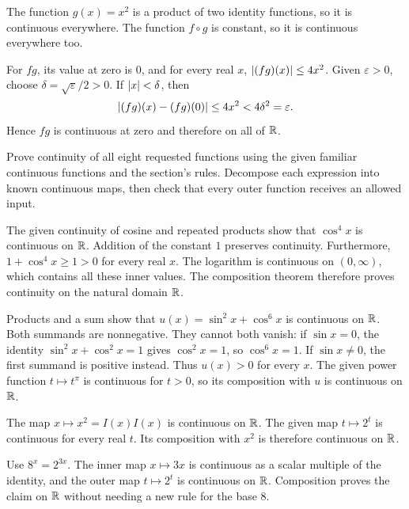The function $g(x)=x^2$ is a product of two identity functions,
so it is continuous everywhere. The function $f\circ g$ is
constant, so it is continuous everywhere too.

For $fg$, its value at zero is $0$, and for every real $x$,
$\left|(fg)(x)\right|\le4x^2$. Given $\varepsilon>0$, choose
$\delta=\sqrt{\varepsilon}/2>0$. If $\left|x\right|<\delta$, then
\[
 \left|(fg)(x)-(fg)(0)\right|\le4x^2<4\delta^2=\varepsilon.
\]
Hence $fg$ is continuous at zero and therefore on all of $\mathbb{R}$.

\goal Prove continuity of all eight requested functions using
the given familiar continuous functions and the section's rules.
\idea Decompose each expression into known continuous maps,
then check that every outer function receives an allowed input.

The given continuity of cosine and repeated products show
that $\cos^4x$ is continuous on $\mathbb{R}$. Addition of the constant
$1$ preserves continuity. Furthermore,
$1+\cos^4x\ge1>0$ for every real $x$.
The logarithm is continuous on $(0,\infty)$, which contains
all these inner values. The composition theorem therefore proves
continuity on the natural domain $\mathbb{R}$.

Products and a sum show that $u(x)=\sin^2x+\cos^6x$ is
continuous on $\mathbb{R}$. Both summands are nonnegative.
They cannot both vanish: if $\sin x=0$, the identity
$\sin^2x+\cos^2x=1$ gives $\cos^2x=1$, so $\cos^6x=1$.
If $\sin x\ne0$, the first summand is positive instead.
Thus $u(x)>0$ for every $x$.
The given power function $t\mapsto t^\pi$ is continuous for
$t>0$, so its composition with $u$ is continuous on $\mathbb{R}$.

The map $x\mapsto x^2=I(x)I(x)$ is continuous on $\mathbb{R}$.
The given map $t\mapsto2^t$ is continuous for every real $t$.
Its composition with $x^2$ is therefore continuous on $\mathbb{R}$.

Use $8^x=2^{3x}$. The inner map $x\mapsto3x$ is continuous
as a scalar multiple of the identity, and the outer map
$t\mapsto2^t$ is continuous on $\mathbb{R}$. Composition proves the
claim on $\mathbb{R}$ without needing a new rule for the base $8$.

